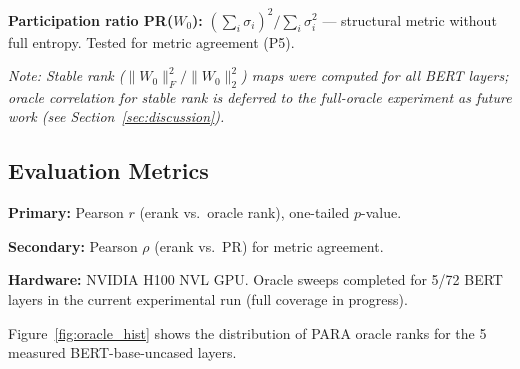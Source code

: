 \textbf{Participation ratio PR($W_0$):} $(\sum_i \sigma_i)^2 / \sum_i \sigma_i^2$ --- structural metric without full entropy. Tested for metric agreement (P5).

\textit{Note: Stable rank ($\|W_0\|_F^2 / \|W_0\|_2^2$) maps were computed for all BERT layers; oracle correlation for stable rank is deferred to the full-oracle experiment as future work (see Section~\ref{sec:discussion}).}

\subsection{Evaluation Metrics}

\textbf{Primary:} Pearson $r$ (erank vs.\ oracle rank), one-tailed $p$-value.

\textbf{Secondary:} Pearson $\rho$ (erank vs.\ PR) for metric agreement.

\textbf{Hardware:} NVIDIA H100 NVL GPU. Oracle sweeps completed for 5/72 BERT layers in the current experimental run (full coverage in progress).

Figure~\ref{fig:oracle_hist} shows the distribution of PARA oracle ranks for the 5 measured BERT-base-uncased layers.

